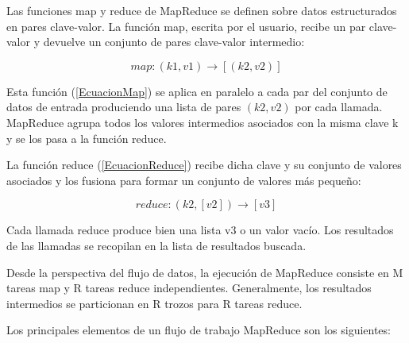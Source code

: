 \documentclass[runningheads]{llncs}
\begin{document}
Las funciones map y reduce de MapReduce se definen sobre datos estructurados en pares clave-valor. La función map, escrita por el 
usuario, recibe un par clave-valor y devuelve un conjunto de pares clave-valor intermedio:

\begin{equation}
	map: (k1 , v1) \xrightarrow{} [(k2 , v2)] 
  \label{EcuacionMap}
\end{equation}


Esta función (\ref{EcuacionMap})  se aplica en paralelo a cada par del conjunto de datos de entrada produciendo una lista de 
pares $(k2, v2)$ por cada llamada. MapReduce agrupa todos los valores intermedios asociados con la misma clave k y se los 
pasa a la función reduce.

La función reduce (\ref{EcuacionReduce}) recibe dicha clave y su conjunto de valores asociados y los fusiona para formar un conjunto 
de valores más pequeño:


\begin{equation}
	reduce: (k2 , [v2]) \xrightarrow{} [v3]
	\label{EcuacionReduce}
\end{equation}


Cada llamada reduce produce bien una lista v3 o un valor vacío. Los resultados de las llamadas se recopilan en la lista de 
resultados buscada. 




Desde la perspectiva del flujo de datos, la ejecución de MapReduce consiste en M tareas map y R tareas reduce independientes. 
Generalmente, los resultados intermedios se particionan en R trozos para R tareas reduce. 



Los principales elementos de un flujo de trabajo MapReduce son los siguientes:
\end{document}
